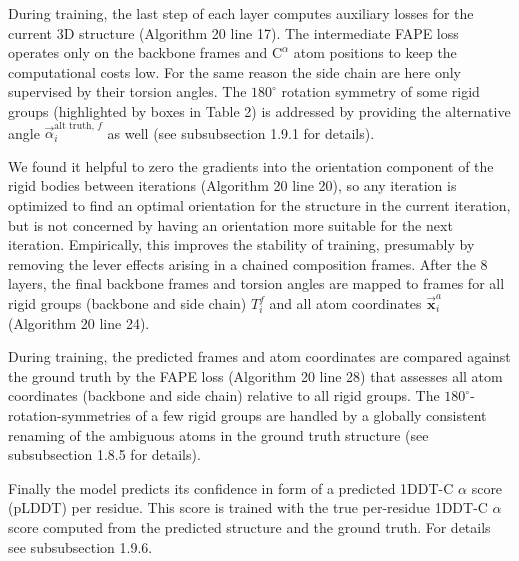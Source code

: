 \documentclass[10pt]{article}
\begin{document}
During training, the last step of each layer computes auxiliary losses for the current 3D structure (Algorithm 20 line 17). The intermediate FAPE loss operates only on the backbone frames and $\mathrm{C}^{\alpha}$ atom positions to keep the computational costs low. For the same reason the side chain are here only supervised by their torsion angles. The $180^{\circ}$ rotation symmetry of some rigid groups (highlighted by boxes in Table 2) is addressed by providing the alternative angle $\vec{\alpha}_{i}^{\text {alt truth, } f}$ as well (see subsubsection 1.9.1 for details).

We found it helpful to zero the gradients into the orientation component of the rigid bodies between iterations (Algorithm 20 line 20), so any iteration is optimized to find an optimal orientation for the structure in the current iteration, but is not concerned by having an orientation more suitable for the next iteration. Empirically, this improves the stability of training, presumably by removing the lever effects arising in a chained composition frames. After the 8 layers, the final backbone frames and torsion angles are mapped to frames for all rigid groups (backbone and side chain) $T_{i}^{f}$ and all atom coordinates $\overrightarrow{\mathbf{x}}_{i}^{a}$ (Algorithm 20 line 24).

During training, the predicted frames and atom coordinates are compared against the ground truth by the FAPE loss (Algorithm 20 line 28) that assesses all atom coordinates (backbone and side chain) relative to all rigid groups. The $180^{\circ}$-rotation-symmetries of a few rigid groups are handled by a globally consistent renaming of the ambiguous atoms in the ground truth structure (see subsubsection 1.8.5 for details).

Finally the model predicts its confidence in form of a predicted 1DDT-C $\alpha$ score (pLDDT) per residue. This score is trained with the true per-residue 1DDT-C $\alpha$ score computed from the predicted structure and the ground truth. For details see subsubsection 1.9.6.
\end{document}
